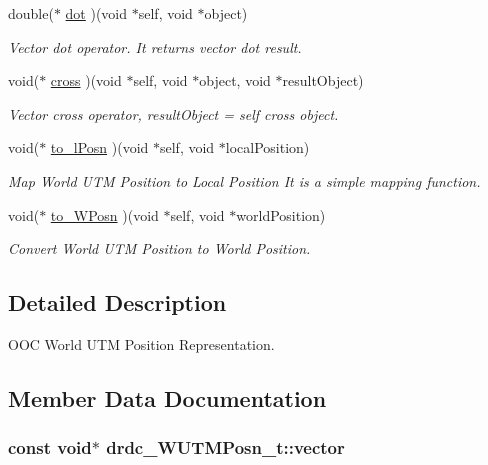 \begin{CompactItemize}
double($\ast$ \hyperlink{structdrdc__WUTMPosn__t_152667cc56a1c8824d624f45028460f6}{dot} )(void $\ast$self, void $\ast$object)
\begin{CompactList}\small\item\em Vector dot operator. It returns vector dot result. \item\end{CompactList}\item 
void($\ast$ \hyperlink{structdrdc__WUTMPosn__t_ecfb44e580963c488c8c48680aca5c05}{cross} )(void $\ast$self, void $\ast$object, void $\ast$resultObject)
\begin{CompactList}\small\item\em Vector cross operator, resultObject = self cross object. \item\end{CompactList}\item 
void($\ast$ \hyperlink{structdrdc__WUTMPosn__t_7175dd5c4ea307a45221bdf70c1973a3}{to\_\-lPosn} )(void $\ast$self, void $\ast$localPosition)
\begin{CompactList}\small\item\em Map World UTM Position to Local Position It is a simple mapping function. \item\end{CompactList}\item 
void($\ast$ \hyperlink{structdrdc__WUTMPosn__t_3931b582e201f37b69d65fa238ca8aff}{to\_\-WPosn} )(void $\ast$self, void $\ast$worldPosition)
\begin{CompactList}\small\item\em Convert World UTM Position to World Position. \item\end{CompactList}\end{CompactItemize}


\subsection{Detailed Description}
OOC World UTM Position Representation. 



\subsection{Member Data Documentation}
\hypertarget{structdrdc__WUTMPosn__t_70880a0baf98a0102abcc138be9fb8cf}{
\subsubsection[vector]{\setlength{\rightskip}{0pt plus 5cm}const void$\ast$ {\bf drdc\_\-WUTMPosn\_\-t::vector}}}
\label{structdrdc__WUTMPosn__t_70880a0baf98a0102abcc138be9fb8cf}


